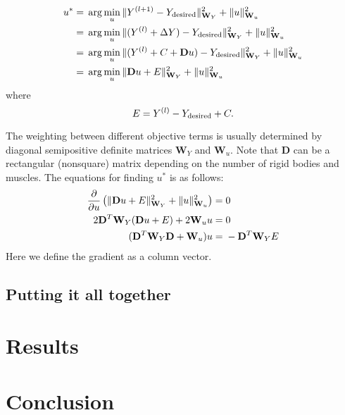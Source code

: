 \documentclass[a4paper,10pt]{article}
\begin{document}
\begin{align}
u^*= {} & \arg\min_{u} \| Y^{(l+1)}                            - Y_\text{desired} \|^2_{\mathbf{W}_Y} + \| u \|^2_{\mathbf{W}_u} \notag\\
   = {} & \arg\min_{u} \| (Y^{(l)} + \Delta Y)                 - Y_\text{desired} \|^2_{\mathbf{W}_Y} + \| u \|^2_{\mathbf{W}_u}\notag\\
   = {} & \arg\min_{u} \| (Y^{(l)} + C + \mathbf{D}u) - Y_\text{desired} \|^2_{\mathbf{W}_Y} + \| u \|^2_{\mathbf{W}_u}\notag\\
   = {} & \arg\min_{u} \| \mathbf{D}u + E \|^2_{\mathbf{W}_Y}  + \| u \|^2_{\mathbf{W}_u}
\end{align}
where
\begin{equation}
E = Y^{(l)} - Y_\text{desired} + C .\notag
\end{equation}

The weighting between different objective terms is
usually determined by diagonal semipositive definite matrices $\mathbf{W}_Y$ and $\mathbf{W}_u$.
Note that $\mathbf{D}$ can be a rectangular (nonsquare) matrix depending on the number of rigid bodies and
muscles. The equations for finding $u^*$ is as follows:
\begin{align}
\frac{\partial}{\partial u} \left( \| \mathbf{D}u + E \|^2_{\mathbf{W}_Y}  + \| u \|^2_{\mathbf{W}_u} \right) = {} & 0  \notag\\
2\mathbf{D}^T\mathbf{W}_Y(\mathbf{D}u+E) + 2 \mathbf{W}_u u = {} & 0\notag\\
(\mathbf{D}^T\mathbf{W}_Y\mathbf{D}+\mathbf{W}_u)u = {} & -\mathbf{D}^T\mathbf{W}_Y E
\end{align}
Here we define the gradient as a column vector.

\subsection{Putting it all together}

\section{Results}

\section{Conclusion}

\pagebreak
\end{document}
